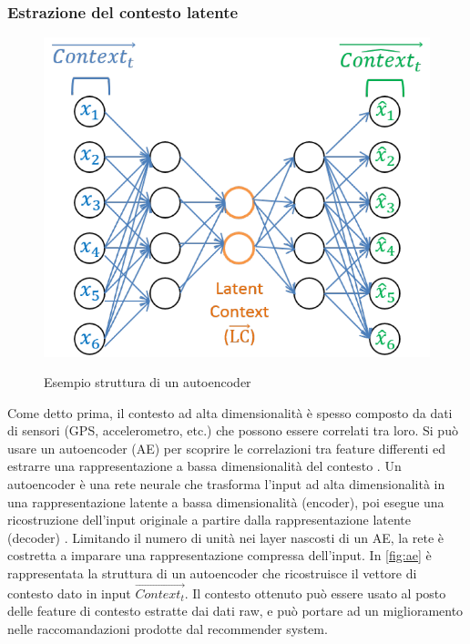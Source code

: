 \documentclass[12pt,italian]{report}
\begin{document}
\subsubsection{Estrazione del contesto latente} 
\label{ssec:latent-context}
\begin{figure}
 \centering
  \includegraphics[scale=0.50]{immagini/autoencoder.png}
  \caption{Esempio struttura di un autoencoder}
  \cite{hierarchical-context}
  \label{fig:ae}
\end{figure}

Come detto prima, il contesto ad alta dimensionalità è spesso composto da dati di sensori (GPS, accelerometro, etc.) che possono essere correlati tra loro. Si può usare un autoencoder (AE) per scoprire le correlazioni tra feature differenti ed estrarre una rappresentazione a bassa dimensionalità del contesto \cite{latent-context}. Un autoencoder è una rete neurale che trasforma l'input ad alta dimensionalità in una rappresentazione latente a bassa dimensionalità (encoder), poi esegue una ricostruzione dell'input originale a partire dalla rappresentazione latente (decoder) \cite{autoencoder}. Limitando il numero di unità nei layer nascosti di un AE, la rete è costretta a imparare una rappresentazione compressa dell'input. In \autoref{fig:ae} è rappresentata la struttura di un autoencoder che ricostruisce il vettore di contesto dato in input $\overrightarrow{Context_t}$. Il contesto ottenuto può essere usato al posto delle feature di contesto estratte dai dati raw, e può portare ad un miglioramento nelle raccomandazioni prodotte dal recommender system.
\end{document}
